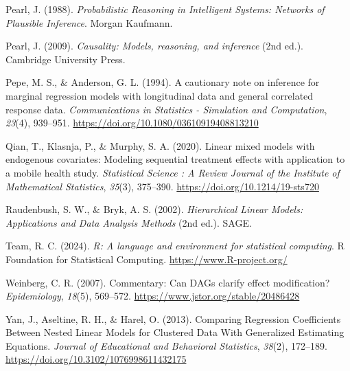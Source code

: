 \documentclass[
  12pt,
  a4paper,
]{article}
\newlength{\cslhangindent}
\newenvironment{CSLReferences}[2] %
 {\begin{list}{}{%
  \setlength{\itemindent}{0pt}
  \setlength{\leftmargin}{0pt}
  \setlength{\parsep}{0pt}
  \ifodd #1
   \setlength{\leftmargin}{\cslhangindent}
   \setlength{\itemindent}{-1\cslhangindent}
  \fi
  \setlength{\itemsep}{#2\baselineskip}}}
 {\end{list}}
\begin{document}
\begin{CSLReferences}{1}{0}
Pearl, J. (1988). \emph{Probabilistic Reasoning in Intelligent Systems:
Networks of Plausible Inference}. Morgan Kaufmann.

Pearl, J. (2009). \emph{Causality: Models, reasoning, and inference}
(2nd ed.). Cambridge University Press.

Pepe, M. S., \& Anderson, G. L. (1994). A cautionary note on inference
for marginal regression models with longitudinal data and general
correlated response data. \emph{Communications in Statistics -
Simulation and Computation}, \emph{23}(4), 939--951.
\url{https://doi.org/10.1080/03610919408813210}

Qian, T., Klasnja, P., \& Murphy, S. A. (2020). Linear mixed models with
endogenous covariates: Modeling sequential treatment effects with
application to a mobile health study. \emph{Statistical Science : A
Review Journal of the Institute of Mathematical Statistics},
\emph{35}(3), 375--390. \url{https://doi.org/10.1214/19-sts720}

Raudenbush, S. W., \& Bryk, A. S. (2002). \emph{Hierarchical Linear
Models: Applications and Data Analysis Methods} (2nd ed.). SAGE.

Team, R. C. (2024). \emph{R: A language and environment for statistical
computing}. R Foundation for Statistical Computing.
\url{https://www.R-project.org/}

Weinberg, C. R. (2007). Commentary: Can DAGs clarify effect
modification? \emph{Epidemiology}, \emph{18}(5), 569--572.
\url{https://www.jstor.org/stable/20486428}

Yan, J., Aseltine, R. H., \& Harel, O. (2013). Comparing Regression
Coefficients Between Nested Linear Models for Clustered Data With
Generalized Estimating Equations. \emph{Journal of Educational and
Behavioral Statistics}, \emph{38}(2), 172--189.
\url{https://doi.org/10.3102/1076998611432175}

\end{CSLReferences}
\end{document}
